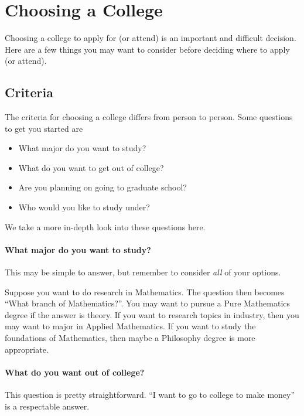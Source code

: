 \documentclass[12pt]{article}
\newenvironment{example}{
\begin{tcolorbox}[title=Example, colback=blue!5!white, colframe=black!75!blue]
}{ \end{tcolorbox} }
\renewcommand{\it}[1]{\textit{{#1}}}
\begin{document}
\newpage
\section{Choosing a College}
Choosing a college to apply for (or attend) is an important and difficult
decision. Here are a few things you may want to consider before deciding where
to apply (or attend).

\subsection{Criteria}
The criteria for choosing a college differs from person to person. Some
questions to get you started are
\begin{itemize}[label=$\to$]
    \item What major do you want to study?
    \item What do you want to get out of college?
    \item Are you planning on going to graduate school?
    \item Who would you like to study under?
\end{itemize}

We take a more in-depth look into these questions here.

\paragraph{What major do you want to study?} This may be simple to answer, but
remember to consider \it{all} of your options.
\begin{example}
    Suppose you want to do research in Mathematics. The question then becomes
    ``What branch of Mathematics?''. You may want to pursue a Pure Mathematics
    degree if the answer is theory. If you want to research topics in industry,
    then you may want to major in Applied Mathematics. If you want to study the
    foundations of Mathematics, then maybe a Philosophy degree is more appropriate.
\end{example}

\paragraph{What do you want out of college?} This question is pretty straightforward.
``I want to go to college to make money'' is a respectable answer.
\end{document}

